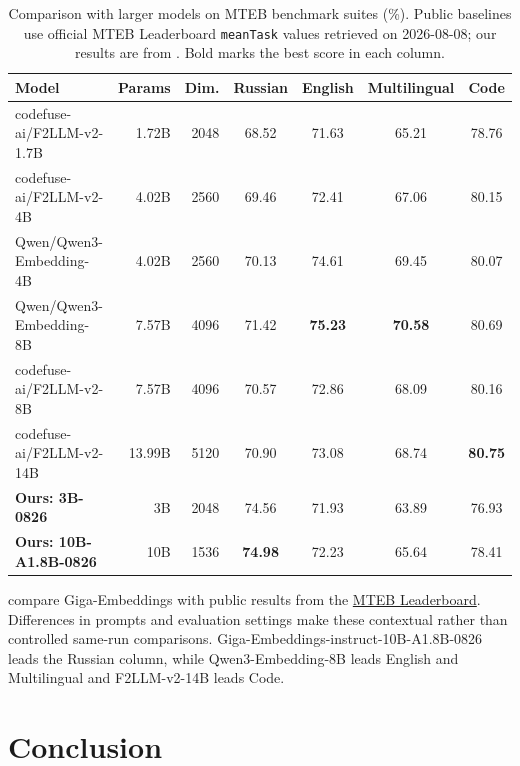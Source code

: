 \documentclass{article}
\begin{document}
\begin{table}[!t]
  \caption{Comparison with larger models on MTEB benchmark suites (\%). Public baselines use official MTEB Leaderboard \texttt{meanTask} values retrieved on 2026-08-08; our results are from . Bold marks the best score in each column.}
  \label{tab:large-baselines}
  \centering
  \small
  \setlength{\tabcolsep}{4.5pt}
  \begin{tabular}{lrrcccc}
    \toprule
    \textbf{Model} & \textbf{Params} & \textbf{Dim.} & \textbf{Russian} & \textbf{English} & \textbf{Multilingual} & \textbf{Code} \\
    \midrule
    codefuse-ai/F2LLM-v2-1.7B                              & 1.72B  & 2048 & 68.52 & 71.63 & 65.21 & 78.76 \\
    codefuse-ai/F2LLM-v2-4B                                & 4.02B  & 2560 & 69.46 & 72.41 & 67.06 & 80.15 \\
    Qwen/Qwen3-Embedding-4B                                & 4.02B  & 2560 & 70.13 & 74.61 & 69.45 & 80.07 \\
    Qwen/Qwen3-Embedding-8B                                & 7.57B  & 4096 & 71.42 & \textbf{75.23} & \textbf{70.58} & 80.69 \\
    codefuse-ai/F2LLM-v2-8B                                & 7.57B  & 4096 & 70.57 & 72.86 & 68.09 & 80.16 \\
    codefuse-ai/F2LLM-v2-14B                               & 13.99B & 5120 & 70.90 & 73.08 & 68.74 & \textbf{80.75} \\
    \midrule
    \textbf{Ours: 3B-0826}                                 & 3B     & 2048 & 74.56 & 71.93 & 63.89 & 76.93 \\
    \textbf{Ours: 10B-A1.8B-0826}                          & 10B    & 1536 & \textbf{74.98} & 72.23 & 65.64 & 78.41 \\
    \bottomrule
  \end{tabular}
\end{table}

 compare Giga-Embeddings with public results from the \href{https://huggingface.co/spaces/mteb/leaderboard}{MTEB Leaderboard}.
Differences in prompts and evaluation settings make these contextual rather than controlled same-run comparisons.
Giga-Embeddings-instruct-10B-A1.8B-0826 leads the Russian column, while Qwen3-Embedding-8B leads English and Multilingual and F2LLM-v2-14B leads Code.

\section{Conclusion}
\end{document}
